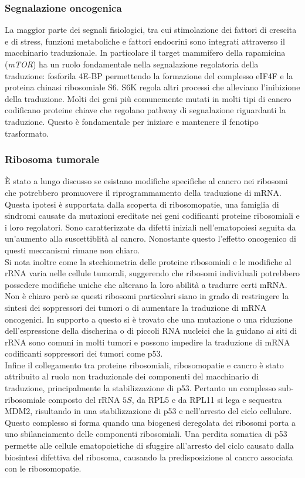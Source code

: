 		\subsubsection{Segnalazione oncogenica}
		La maggior parte dei segnali fisiologici, tra cui stimolazione dei fattori di crescita e di stress, funzioni metaboliche e fattori endocrini sono integrati attraverso il macchinario traduzionale.
		In particolare il target mammifero della rapamicina (\emph{mTOR}) ha un ruolo fondamentale nella segnalazione regolatoria della traduzione: fosforila 4E-BP permettendo la formazione del complesso eIF4F e la proteina chinasi ribosomiale S6.
		S6K regola altri processi che alleviano l'inibizione della traduzione.
		Molti dei geni pi\`u comunemente mutati in molti tipi di cancro codificano proteine chiave che regolano pathway di segnalazione riguardanti la traduzione.
		Questo \`e fondamentale per iniziare e mantenere il fenotipo trasformato.

		\subsubsection{Ribosoma tumorale}
		\`E stato a lungo discusso se esistano modifiche specifiche al cancro nei ribosomi che potrebbero promuovere il riprogrammamento della traduzione di mRNA.
		Questa ipotesi \`e supportata dalla scoperta di ribosomopatie, una famiglia di sindromi causate da mutazioni ereditate nei geni codificanti proteine ribosomiali e i loro regolatori.
		Sono caratterizzate da difetti iniziali nell'ematopoiesi seguita da un'aumento alla suscettiblit\`a al cancro.
		Nonostante questo l'effetto oncogenico di questi meccanismi rimane non chiaro.\\
		Si nota inoltre come la stechiometria delle proteine ribosomiali e le modifiche al rRNA varia nelle cellule tumorali, suggerendo che ribosomi individuali potrebbero possedere modifiche uniche che alterano la loro abilit\`a a tradurre certi mRNA.
		Non \`e chiaro per\`o se questi ribosomi particolari siano in grado di restringere la sintesi dei soppressori dei tumori o di aumentare la traduzione di mRNA oncogenici.
		In supporto a questo si \`e trovato che una mutazione o una riduzione dell'espressione della discherina o di piccoli RNA nucleici che la guidano ai siti di rRNA sono comuni in molti tumori e possono impedire la traduzione di mRNA codificanti soppressori dei tumori come p53.\\
		Infine il collegamento tra proteine ribosomiali, ribosomopatie e cancro \`e stato attribuito al ruolo non traduzionale dei componenti del macchinario di traduzione, principalmente la stabilizzazione di p53.
		Pertanto un complesso sub-ribosomiale composto del rRNA $5S$, da RPL5 e da RPL11 si lega e sequestra MDM2, risultando in una stabilizzazione di p53 e nell'arresto del ciclo cellulare.
		Questo complesso si forma quando una biogenesi deregolata dei ribosomi porta a uno sbilanciamento delle componenti ribosomiali.
		Una perdita somatica di p53 permette alle cellule ematopoietiche di sfuggire all'arresto del ciclo causato dalla biosintesi difettiva del ribosoma, causando la predisposizione al cancro associata con le ribosomopatie.

